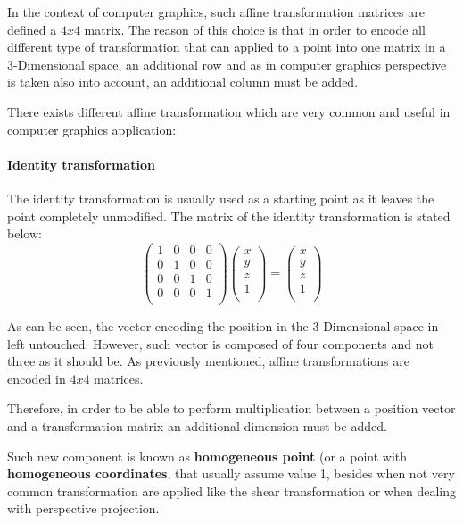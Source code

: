 \documentclass[12pt,a4paper]{extarticle}
\newcommand{\linespace}{\vspace{8pt}}
\begin{document}
In the context of computer graphics, such affine transformation matrices are defined a $4x4$ matrix. The reason of this choice is that in order to encode all different type of transformation that can applied to a point into one matrix in a 3-Dimensional space, an additional row and as in computer graphics perspective is taken also into account, an additional column must be added.
\linespace

There exists different affine transformation which are very common and useful in computer graphics application:
\paragraph{Identity transformation} The identity transformation is usually used as a starting point as it leaves the point completely unmodified. The matrix of the identity transformation is stated below:
\[
\begin{pmatrix}
1 & 0 & 0 & 0\\
0 & 1 & 0 & 0\\
0 & 0 & 1 & 0\\
0 & 0 & 0 & 1\\
\end{pmatrix}
\begin{pmatrix}
x\\
y\\
z\\
1\\
\end{pmatrix}
=
\begin{pmatrix}
x\\
y\\
z\\
1\\
\end{pmatrix}
\]

As can be seen, the vector encoding the position in the 3-Dimensional space in left untouched. However, such vector is composed of four components and not three as it should be. As previously mentioned, affine transformations are encoded in $4x4$ matrices.

Therefore, in order to be able to perform multiplication between a position vector and a transformation matrix an additional dimension must be added. 
 
Such new component is known as \textbf{homogeneous point} (or a point with \textbf{homogeneous coordinates}, that usually assume value 1, besides when not very common transformation are applied like the shear transformation or when dealing with perspective projection.
\end{document}
